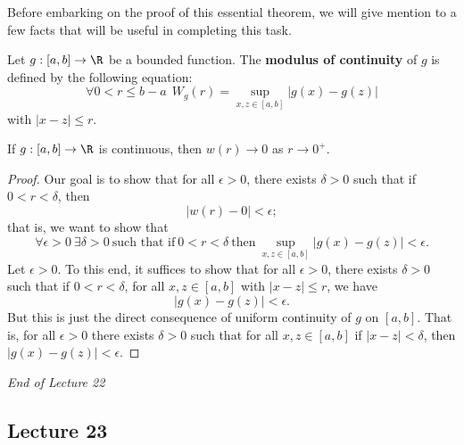 Before embarking on the proof of this essential theorem, we will give mention to a few facts that will be useful in completing this task. 

\begin{definition}
    Let \( g: [a,b] \to \R  \) be a bounded function. The \textbf{modulus of continuity} of \( g  \) is defined by the following equation:
    \[  \forall 0 < r \leq b - a \ \ {W}_{g}(r) = \sup_{x,z \in [a,b]} | g(x) - g(z) |  \]
    with \( | x - z  |  \leq r  \).
\end{definition}


\begin{prop}[Fact 1]\label{Fact 1}
    If \( g:[a,b] \to \R  \) is continuous, then \( w(r) \to 0  \) as \( r \to 0^{+}  \). 
\end{prop}
\begin{proof}
Our goal is to show that for all \( \epsilon > 0  \), there exists \( \delta > 0  \) such that if \( 0 < r < \delta  \), then 
\[  | w(r) - 0  |  < \epsilon; \]
that is, we want to show that 
\[  \forall \epsilon > 0 \ \exists \delta > 0 \ \text{such that if} \ 0 < r < \delta \ \text{then} \ \sup_{x,z \in [a,b]} | g(x) - g(z) |  < \epsilon. \]
Let \( \epsilon > 0 \). To this end, it suffices to show that for all \( \epsilon > 0  \), there exists \( \delta > 0  \) such that if \( 0 < r < \delta  \), for all \( x,z \in [a,b] \) with \( | x - z  |  \leq r  \), we have  
\[  |g(x) - g(z)|  < \epsilon. \]
But this is just the direct consequence of uniform continuity of \( g  \) on \( [a,b] \). That is, for all \( \epsilon > 0  \) there exists \( \delta > 0  \) such that for all \( x,z \in [a,b] \) if \( |  x - z  |  < \delta  \), then \( | g(x) - g(z) |  < \epsilon \). 
\end{proof}

\begin{center}
    \textit{End of Lecture 22} 
\end{center}


\subsection{Lecture 23}


